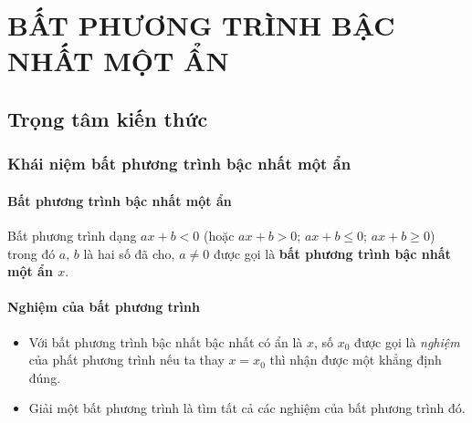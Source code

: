\setcounter{section}{1}
\section{BẤT PHƯƠNG TRÌNH BẬC NHẤT MỘT ẨN}
\subsection{Trọng tâm kiến thức}
\begin{tomtat}
\subsubsection{Khái niệm bất phương trình bậc nhất một ẩn}
\paragraph{Bất phương trình bậc nhất một ẩn}
\begin{boxdn}
	Bất phương trình dạng $ax + b < 0$ (hoặc $ax + b > 0$; $ax + b \leq 0$; $ax + b \geq 0$) trong đó $a$, $b$ là hai số đã cho, $a \neq 0$ được gọi là \textbf{bất phương trình bậc nhất một ẩn $x$}.
\end{boxdn}
\paragraph{Nghiệm của bất phương trình}
\begin{boxdn}
	\begin{itemize}
	\item Với bất phương trình bậc nhất bậc nhất có ẩn là $x$, số $x_0$ được gọi là {\it nghiệm} của phất phương trình nếu ta thay $x=x_0$ thì nhận được một khẳng định đúng. 
	\item Giải một bất phương trình là tìm tất cả các nghiệm của bất phương trình đó.
	\end{itemize}
\end{boxdn}

\end{tomtat}
